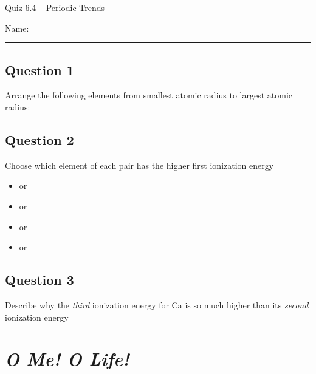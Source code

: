 \documentclass[11pt, letterpaper]{memoir}
\begin{document}
	\begin{center}
		{\large	Quiz 6.4 -- Periodic Trends}
	\end{center}
{\large Name: \rule[-1mm]{4in}{.1pt}
	
	\subsection*{Question 1}
	Arrange the following elements from smallest atomic radius to largest atomic radius:
	
	 \hspace{2em}  \hspace{2em}  \hspace{2em}  \hspace{2em}  \hspace{2em} 
	
	\vspace{8em}
	\subsection*{Question 2}
	Choose which element of each pair has the higher first ionization energy
	
	\begin{itemize}
		\item {} or 
		\item \vspace{0.5em} or 
		\item \vspace{0.5em} or 
		\item \vspace{0.5em} or 
	\end{itemize}
	
	\vspace{0.25em}
	\subsection*{Question 3}
	Describe why the \emph{third} ionization energy for Ca is so much higher than its \emph{second} ionization energy
\newpage
\pagestyle{empty}
\addtocounter{page}{-1}
\section*{\emph{O Me! O Life!}}
}
\end{document}
